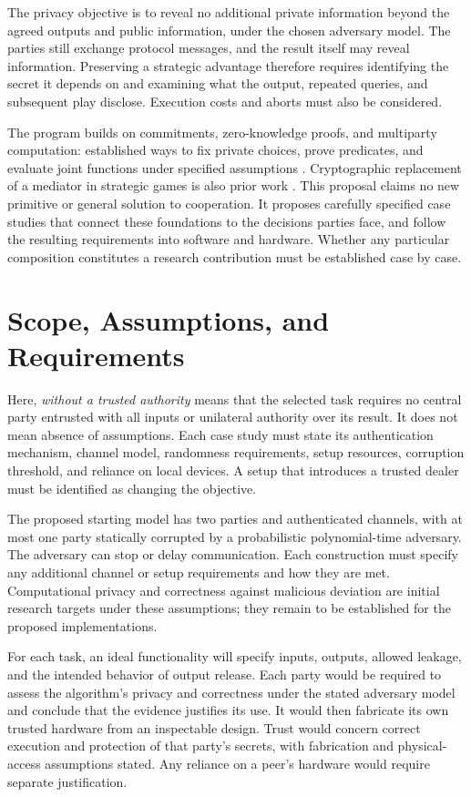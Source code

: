 \documentclass[conference,letterpaper]{IEEEtran}
\begin{document}
The privacy objective is to reveal no additional private information beyond
the agreed outputs and public information, under the chosen adversary model.
The parties still exchange protocol messages, and the result itself may
reveal information. Preserving a strategic advantage therefore requires
identifying the secret it depends on and examining what the output, repeated
queries, and subsequent play disclose. Execution costs and aborts must also
be considered.

The program builds on commitments, zero-knowledge proofs, and
multiparty computation: established ways to fix private choices, prove predicates,
and evaluate joint functions under specified assumptions
\cite{naor1991,gmr1989,gmw1987}. Cryptographic replacement of a mediator in
strategic games is also prior work \cite{dodis2000}. This proposal claims no
new primitive or general solution to cooperation. It proposes carefully
specified case studies that connect these foundations to the decisions
parties face, and follow the resulting requirements into software and
hardware. Whether any particular composition constitutes a research
contribution must be established case by case.

\section{Scope, Assumptions, and Requirements}
Here, \emph{without a trusted authority} means that the selected task requires
no central party entrusted with all inputs or unilateral authority over its
result. It does not mean absence of assumptions. Each case study must state
its authentication mechanism, channel model, randomness requirements, setup
resources, corruption threshold, and reliance on local devices. A setup that
introduces a trusted dealer must be identified as changing the objective.

The proposed starting model has two parties and authenticated channels, with
at most one party statically corrupted by a probabilistic polynomial-time
adversary. The adversary can stop or delay communication. Each construction
must specify any additional channel or setup requirements and how they are
met. Computational privacy and correctness against malicious deviation are
initial research targets under these assumptions; they remain to be
established for the proposed implementations.

For each task, an ideal functionality will specify inputs, outputs, allowed
leakage, and the intended behavior of output release. Each party would be
required to assess the algorithm's privacy and correctness under the stated
adversary model and conclude that the evidence justifies its use. It would
then fabricate its own trusted hardware from an inspectable design. Trust
would concern correct execution and protection of that party's secrets,
with fabrication and physical-access assumptions stated. Any reliance on a
peer's hardware would require separate justification.
\end{document}
